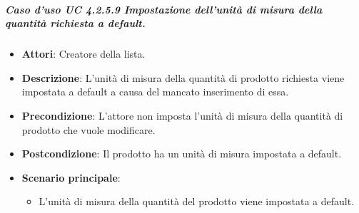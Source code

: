 \subparagraph{Caso d'uso UC 4.2.5.9 Impostazione dell'unità di misura della quantità richiesta a default.}
	\begin{itemize}
		\item\textbf{Attori}: Creatore della lista.
		\item\textbf{Descrizione}: L'unità di misura della quantità di prodotto richiesta viene impostata a default a causa del mancato inserimento di essa.
		\item\textbf{Precondizione}: L'attore non imposta l'unità di misura della quantità di prodotto che vuole modificare.
		\item\textbf{Postcondizione}: Il prodotto ha un unità di misura impostata a default.
		\item\textbf{Scenario principale}:
			\begin{itemize}
				\item L'unità di misura della quantità del prodotto viene impostata a default.
			\end{itemize}
		
\end{itemize}

